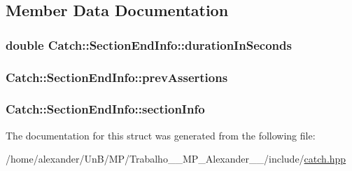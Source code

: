 \subsection{Member Data Documentation}
\hypertarget{structCatch_1_1SectionEndInfo_a7c262f2dab9cff166b8eca620c47eea5}{
\subsubsection[{duration\-In\-Seconds}]{\setlength{\rightskip}{0pt plus 5cm}double Catch\-::\-Section\-End\-Info\-::duration\-In\-Seconds}}\label{structCatch_1_1SectionEndInfo_a7c262f2dab9cff166b8eca620c47eea5}
\hypertarget{structCatch_1_1SectionEndInfo_ae70b154cbc05b5dd2901d97f89303d8c}{
\subsubsection[{prev\-Assertions}]{ Catch\-::\-Section\-End\-Info\-::prev\-Assertions}}\label{structCatch_1_1SectionEndInfo_ae70b154cbc05b5dd2901d97f89303d8c}
\hypertarget{structCatch_1_1SectionEndInfo_a2d44793392cb83735d086d726822abe9}{
\subsubsection[{section\-Info}]{ Catch\-::\-Section\-End\-Info\-::section\-Info}}\label{structCatch_1_1SectionEndInfo_a2d44793392cb83735d086d726822abe9}


The documentation for this struct was generated from the following file\-:\begin{DoxyCompactItemize}
\item 
/home/alexander/\-Un\-B/\-M\-P/\-Trabalho\-\_\-\_\-\-M\-P\-\_\-\-Alexander\-\_\-\_/include/\hyperlink{catch_8hpp}{catch.\-hpp}\end{DoxyCompactItemize}
